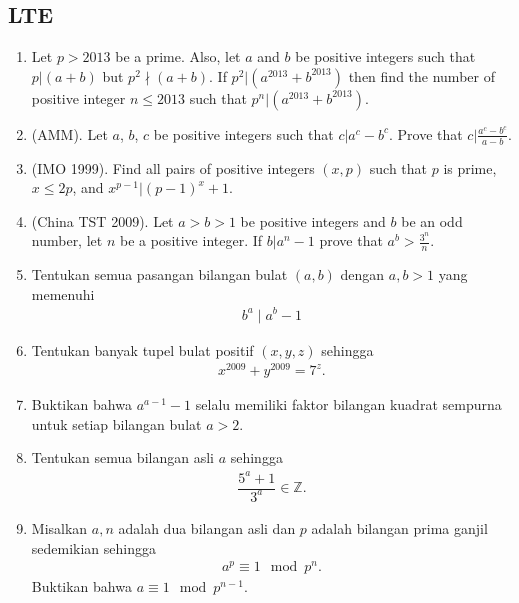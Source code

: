 \documentclass[12pt]{scrartcl}
\begin{document}
\subsection{LTE}
\begin{enumerate}[resume]
    \item Let $p > 2013$ be a prime. Also, let $a$ and $b$ be positive integers such that $p|(a + b)$ but $p^2 \nmid  (a + b)$. If $p^2|(a^{2013} + b^{2013})$ then find the number of positive integer $n \leq 2013$ such that $p^n|(a^{2013} + b^{2013})$.
    
    \item (AMM). Let $a$, $b$, $c$ be positive integers such that $c | a^c-b^c$. Prove that $c | \frac{a^c-b^c}{a-b}$.
    
    \item (IMO 1999). Find all pairs of positive integers $(x, p)$ such that $p$ is prime, $x \leq 2p$, and $x^{p-1} | (p - 1)^x + 1$.
    
    \item (China TST 2009). Let $a > b > 1$ be positive integers and $b$ be an odd number, let $n$ be a positive integer. If $b|a^n-1$ prove that $a^b > \frac{3^n}{n}$.
    
    \item Tentukan semua pasangan bilangan bulat $(a,b)$ dengan $a,b > 1$ yang memenuhi 
    \begin{align*}
        b^a \mid a^b -1
    \end{align*}
    
    \item Tentukan banyak tupel bulat positif $(x,y,z)$ sehingga
    \begin{align*}
        x^{2009}+y^{2009} = 7^z.
    \end{align*}
    
    \item Buktikan bahwa $a^{a-1}-1$ selalu memiliki faktor bilangan kuadrat sempurna untuk setiap bilangan bulat $a > 2$.
    
    \item Tentukan semua bilangan asli $a$ sehingga
    \begin{align*}
        \dfrac{5^a+1}{3^a} \in \mathbb{Z}.
    \end{align*}
    
    \item Misalkan $a,n$ adalah dua bilangan asli dan $p$ adalah bilangan prima ganjil sedemikian sehingga
    \begin{align*}
        a^p \equiv 1 \mod p^n.
    \end{align*}
    Buktikan bahwa $a \equiv 1 \mod p^{n-1}.$


\end{enumerate}
\end{document}

